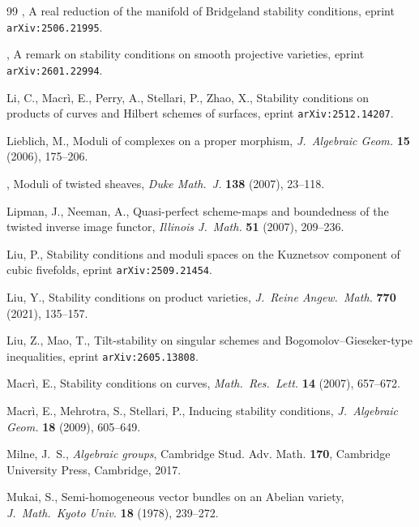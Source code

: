 \documentclass[11pt, reqno]{amsart}
\numberwithin{equation}{section}
\theoremstyle{plain}
\theoremstyle{remark}
\theoremstyle{definition}
\theoremstyle{italicsname}
\begin{document}
\begin{thebibliography}{99}
\bysame, A real reduction of the manifold of Bridgeland stability conditions, eprint {\tt arXiv:2506.21995}.

\bysame, A remark on stability conditions on smooth projective varieties, eprint {\tt arXiv:2601.22994}.

Li, C., Macr\`i, E., Perry, A., Stellari, P., Zhao, X., Stability conditions on products of curves and Hilbert schemes of surfaces, eprint {\tt arXiv:2512.14207}.


Lieblich, M., Moduli of complexes on a proper morphism, {\it J.\ Algebraic Geom.} \textbf{15} (2006), 175--206.

\bysame, Moduli of twisted sheaves, {\it Duke Math.\ J.} {\bf 138} (2007), 23--118.

Lipman, J., Neeman, A., Quasi-perfect scheme-maps and boundedness of the twisted inverse image functor, {\it Illinois J.\ Math.} {\bf 51} (2007), 209--236.

Liu, P., Stability conditions and moduli spaces on the Kuznetsov component of cubic fivefolds, eprint {\tt arXiv:2509.21454}.

Liu, Y., Stability conditions on product varieties, {\it J.\ Reine Angew.\ Math.} \textbf{770} (2021), 135--157.

Liu, Z., Mao, T., Tilt-stability on singular schemes and Bogomolov--Gieseker-type inequalities, eprint {\tt arXiv:2605.13808}.

Macr\`i, E., Stability conditions on curves, {\it Math.\ Res.\ Lett.} \textbf{14} (2007), 657--672.

Macr\`i, E., Mehrotra, S., Stellari, P., Inducing stability conditions, {\it J.\ Algebraic Geom.} {\bf 18} (2009), 605--649.

Milne, J.~S., {\it Algebraic groups}, Cambridge Stud. Adv. Math. {\bf 170}, Cambridge University Press, Cambridge, 2017.

Mukai, S., Semi-homogeneous vector bundles on an Abelian variety, {\it J.\ Math.\ Kyoto Univ.} \textbf{18} (1978), 239--272.


\end{thebibliography}
\end{document}
